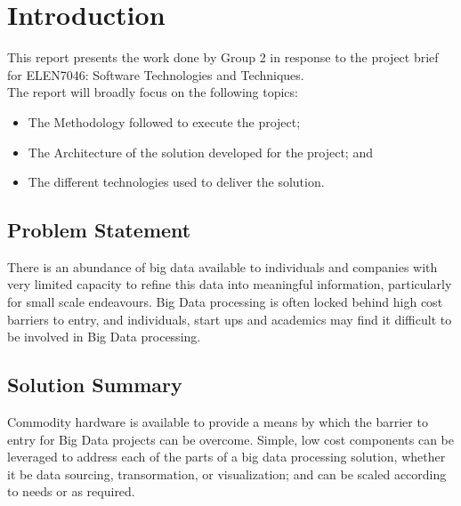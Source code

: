 \documentclass[12pt]{article} %
\begin{document}
	\tableofcontents %
	
	\newpage %
	
	
	\section{Introduction} %
	
This report presents the work done by Group 2 in response to the project brief for ELEN7046: Software Technologies and Techniques.\\

The report will broadly focus on the following topics:

\begin{itemize}
	\item The Methodology followed to execute the project;
	\item The Architecture of the solution developed for the project; and
	\item The different technologies used to deliver the solution.
\end{itemize}

\subsection{Problem Statement}

There is an abundance of big data available to individuals and companies with very limited capacity to refine this data into meaningful information, particularly for small scale endeavours. Big Data processing is often locked behind high cost barriers to entry, and individuals, start ups and academics may find it difficult to be involved in Big Data processing.

\subsection{Solution Summary}

Commodity hardware is available to provide a means by which the barrier to entry for Big Data projects can be overcome. Simple, low cost components can be leveraged to address each of the parts of a big data processing solution, whether it be data sourcing, transormation, or visualization; and can be scaled according to needs or as required.
\end{document}
